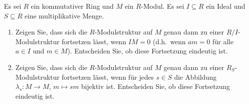 \begin{question}
  \label{question: extension of module structures onto quotients and localizations}
  Es sei $R$ ein kommutativer Ring und $M$ ein $R$-Modul.
  Es sei $I \subseteq R$ ein Ideal und $S \subseteq R$ eine multiplikative Menge.
  \begin{enumerate}
    \item
      Zeigen Sie, dass sich die $R$-Modulstruktur auf $M$ genau dann zu einer $R/I$-Modulstruktur fortsetzen lässt, wenn $IM =  0$ (d.h.\ wenn $am = 0$ für alle $a \in I$ und $m \in M$).
      Entscheiden Sie, ob diese Fortsetzung eindeutig ist.
    \item
      Zeigen Sie, dass sich die $R$-Modulstruktur auf $M$ genau dann zu einer $R_S$-Modulstruktur fortsetzen lässt, wenn für jedes $s \in S$ die Abbildung $\lambda_s \colon M \to M$, $m \mapsto sm$ bijektiv ist.
      Entscheiden Sie, ob diese Fortsetzung eindeutig ist.
  \end{enumerate}
\end{question}


